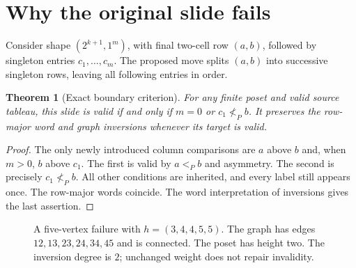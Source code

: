\documentclass[11pt,a4paper]{article}
\newtheorem{theorem}{Theorem}[section]
\theoremstyle{definition}
\newcommand{\cell}[4]{\draw[draw=ink,fill=#4,rounded corners=1pt] (#1,#2) rectangle ++(.68,.68);\node[text=ink] at (#1+.34,#2+.34) {$#3$};}
\begin{document}
\section{Why the original slide fails}

Consider shape $(2^{k+1},1^m)$, with final two-cell row $(a,b)$, followed by
singleton entries $c_1,\ldots,c_m$. The proposed move splits $(a,b)$ into
successive singleton rows, leaving all following entries in order.

\begin{theorem}[Exact boundary criterion]\label{thm:boundary}
For any finite poset and valid source tableau, this slide is valid if and only
if $m=0$ or $c_1\not<_P b$. It preserves the row-major word and graph inversions
whenever its target is valid.
\end{theorem}
\begin{proof}
The only newly introduced column comparisons are $a$ above $b$ and, when
$m>0$, $b$ above $c_1$. The first is valid by $a<_P b$ and asymmetry.
The second is precisely $c_1\not<_P b$. All other conditions are inherited,
and every label still appears once. The row-major words coincide. The
word interpretation of inversions gives the last assertion.
\end{proof}

\begin{figure}[ht]
\centering
{}
\caption{A five-vertex failure with $h=(3,4,4,5,5)$. The graph has edges
$12,13,23,24,34,45$ and is connected. The poset has height two.
The inversion degree is $2$; unchanged weight does not repair invalidity.}
\label{fig:failure}
\end{figure}
\end{document}
